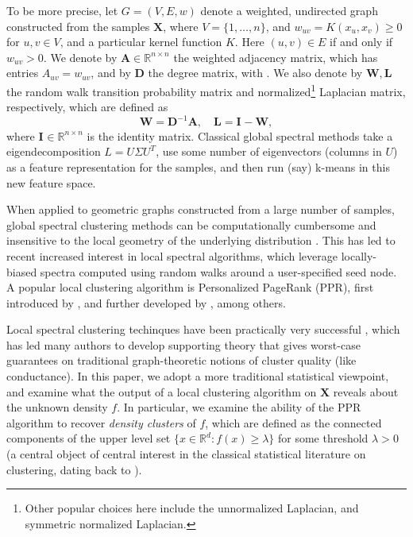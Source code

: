 \documentclass{article}
\newcommand{\Reals}{\mathbb{R}}
\newcommand{\Rd}{\Reals^d}
\newcommand{\1}{\mathbf{1}}
\newcommand{\Abf}{\mathbf{A}}
\newcommand{\Xbf}{\mathbf{X}}
\newcommand{\Wbf}{\mathbf{W}}
\newcommand{\Lbf}{\mathbf{L}}
\newcommand{\Dbf}{\mathbf{D}}
\newcommand{\Ibf}[1]{\mathbf{I}_{#1}}
\theoremstyle{aldenthm}
\theoremstyle{aldenrmrk}
\begin{document}
To be more precise, let $G=(V,E,w)$ denote a weighted, undirected graph  
constructed from the samples $\mathbf{X}$, where $V=\{1,\ldots,n\}$, and $w_{uv}
= K(x_u,x_v) \geq 0$ for $u,v \in V$, and a particular kernel function $K$.
Here $(u,v) \in E$ if and only if $w_{uv} > 0$.  We denote by $\Abf \in
\Reals^{n \times n}$ the weighted adjacency matrix, which has entries
$A_{uv}=w_{uv}$, and by $\Dbf$ the degree matrix, with 
\smash{$\Dbf_{uu} = \sum_{v \in V} \Abf_{uv}$}.  We also denote by $\Wbf,\Lbf$
the random walk transition probability matrix and normalized\footnote{Other
  popular choices here include the unnormalized Laplacian, and symmetric
  normalized Laplacian.} 
Laplacian matrix, respectively, which are defined as
$$
\Wbf = \Dbf^{-1}\Abf, \quad \Lbf = \Ibf{} - \Wbf,
$$
where $\Ibf{} \in \Reals^{n\times n}$ is the identity matrix.  Classical global
spectral methods take a eigendecomposition $L=U \Sigma U^T$, use some 
number of eigenvectors (columns in $U$) as a feature representation for the
samples, and then run (say) k-means in this new feature space.

When applied to geometric graphs constructed from a large number of samples,
global spectral clustering methods can be computationally cumbersome and   
insensitive to the local geometry of the underlying distribution
\citep{leskovec2010,mahoney2012}.  This has led to recent increased interest in
local spectral algorithms, which leverage locally-biased spectra computed using
random walks around a user-specified seed node.  A popular local clustering
algorithm is Personalized PageRank (PPR), first introduced by
\citep{haveliwala2003}, and further developed by
\citep{spielman2011,spielman2014,andersen2006,mahoney2012,zhu2013},
among others.  

Local spectral clustering techinques have been practically very successful
\citep{leskovec2010,andersen2012,gleich2012,mahoney2012,wu2012}, which has led
many authors to develop supporting theory
\citep{spielman2013,andersen2009,gharan2012,zhu2013} that gives worst-case
guarantees on traditional graph-theoretic notions of cluster quality (like
conductance).  In this paper, we adopt a more traditional statistical viewpoint,
and examine what the output of a local clustering algorithm on $\Xbf$ reveals
about the unknown density $f$.  In particular, we examine the ability of the PPR
algorithm to recover \emph{density clusters} of $f$, which are defined as the
connected components of the upper level set $\{x \in \Rd : f(x) \geq \lambda\}$
for some threshold $\lambda > 0$ (a central object of central interest in the
classical statistical literature on clustering, dating back to
\citet{hartigan1981}).
\end{document}
